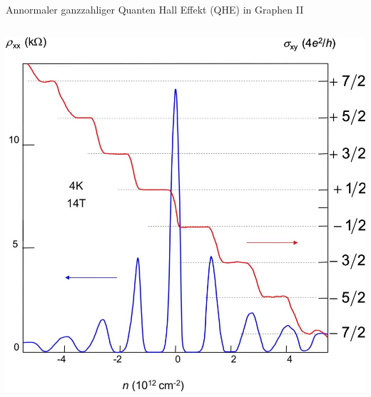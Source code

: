 \documentclass[../defence.tex]{subfiles}
\begin{document}
  \begin{frame}{Annormaler ganzzahliger Quanten Hall Effekt (QHE) in Graphen II}
    \begin{columns}[onlytextwidth, T]
        \includegraphics[width=\linewidth]{images/qhe.png}
        \cite{geim2007}
    \end{columns}
  \end{frame}
\end{document}
